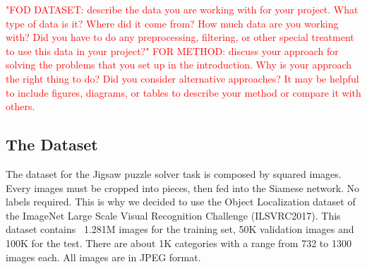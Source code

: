 
\textcolor{red}{"FOD DATASET: describe the data you are working with for your project. What type of data is it? Where did it come from? How much data are you working with? Did you have to do any preprocessing, filtering, or other special treatment to use this data in your project?"\newline
FOR METHOD: discuss your approach for solving the problems that you set up in the introduction. Why is your approach the right thing to do? Did you consider alternative approaches? It may be helpful to include figures, diagrams, or tables to describe your method or compare it with others.}

\subsection{The Dataset}
The dataset for the Jigsaw puzzle solver task is composed by squared images. Every images must be cropped into pieces, then fed into the Siamese network. No labels required. This is why we decided to use the Object Localization dataset \cite{ILSVRC15} of the ImageNet Large Scale Visual Recognition Challenge (ILSVRC2017). This dataset contains ~1.281M images for the training set, 50K validation images and 100K for the test. There are about 1K categories with a range from 732 to 1300 images each. All images are in JPEG format.

